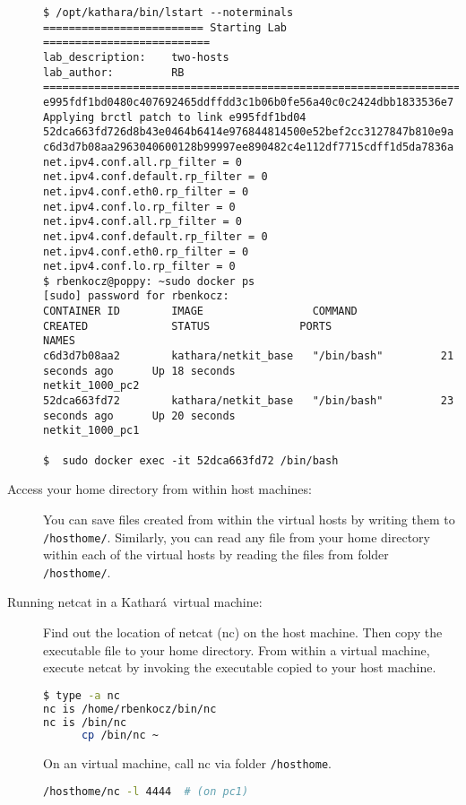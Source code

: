 \documentclass[12pt]{book}
\newcommand{\kathara}{Kathar\'a}
\begin{document}
\begin{description}
  \begin{lstlisting}
$ /opt/kathara/bin/lstart --noterminals
========================= Starting Lab ==========================
lab_description:    two-hosts
lab_author:         RB
=================================================================
e995fdf1bd0480c407692465ddffdd3c1b06b0fe56a40c0c2424dbb1833536e7
Applying brctl patch to link e995fdf1bd04
52dca663fd726d8b43e0464b6414e976844814500e52bef2cc3127847b810e9a
c6d3d7b08aa2963040600128b99997ee890482c4e112df7715cdff1d5da7836a
net.ipv4.conf.all.rp_filter = 0
net.ipv4.conf.default.rp_filter = 0
net.ipv4.conf.eth0.rp_filter = 0
net.ipv4.conf.lo.rp_filter = 0
net.ipv4.conf.all.rp_filter = 0
net.ipv4.conf.default.rp_filter = 0
net.ipv4.conf.eth0.rp_filter = 0
net.ipv4.conf.lo.rp_filter = 0
$ rbenkocz@poppy: ~sudo docker ps
[sudo] password for rbenkocz: 
CONTAINER ID        IMAGE                 COMMAND             CREATED             STATUS              PORTS               NAMES
c6d3d7b08aa2        kathara/netkit_base   "/bin/bash"         21 seconds ago      Up 18 seconds                           netkit_1000_pc2
52dca663fd72        kathara/netkit_base   "/bin/bash"         23 seconds ago      Up 20 seconds                           netkit_1000_pc1

$  sudo docker exec -it 52dca663fd72 /bin/bash
\end{lstlisting}


  \item[Access your home directory from within host machines:] You can
    save files created from within the virtual hosts by writing them
    to \verb$/hosthome/$. Similarly, you can read any file from your
    home directory within each of the virtual hosts by reading the
    files from folder \verb$/hosthome/$.

  \item[Running netcat in a \kathara\ virtual machine:] Find out the
    location of netcat (nc) on the host machine. Then copy the
    executable file to your home directory. From within a virtual
    machine, execute netcat by invoking the executable copied to your
    host machine.
 
    \begin{lstlisting}[language=bash]
      $ type -a nc
nc is /home/rbenkocz/bin/nc
nc is /bin/nc
      cp /bin/nc ~
    \end{lstlisting}

    On an virtual machine, call nc via folder \verb$/hosthome$.
    \begin{lstlisting}[language=bash]
      /hosthome/nc -l 4444  # (on pc1)


\end{lstlisting}
\end{description}
\end{document}
